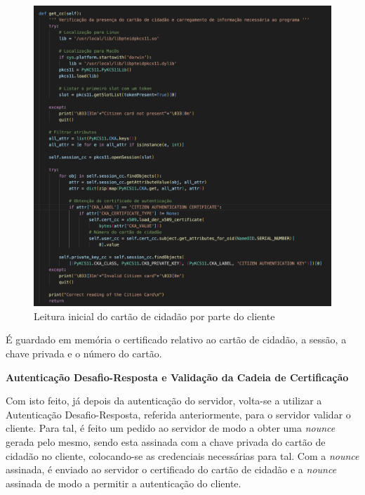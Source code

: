 \documentclass[10pt,english]{article}
\begin{document}
\begin{figure}[!h]
        \centering
        \includegraphics[width=450]{images/get_cc_client.png}
        \caption{Leitura inicial do cartão de cidadão por parte do cliente}
\end{figure}

\par É guardado em memória o certificado relativo ao cartão de cidadão, a sessão, a chave privada e o número do cartão.

\clearpage

\textbf{Autenticação Desafio-Resposta e Validação da Cadeia de Certificação}

\par Com isto feito, já depois da autenticação do servidor, volta-se a utilizar a Autenticação Desafio-Resposta, referida anteriormente, para o servidor validar o cliente. Para tal, é feito um pedido ao servidor de modo a obter uma \textit{nounce} gerada pelo mesmo, sendo esta assinada com a chave privada do cartão de cidadão no cliente, colocando-se as credenciais necessárias para tal. Com a \textit{nounce} assinada, é enviado ao servidor o certificado do cartão de cidadão e a \textit{nounce} assinada de modo a permitir a autenticação do cliente.
\end{document}
